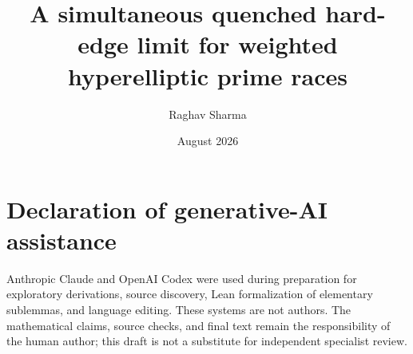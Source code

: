 \documentclass[11pt]{article}
\title{A simultaneous quenched hard-edge limit for weighted hyperelliptic
prime races}
\author{Raghav Sharma}
\date{August 2026}
\numberwithin{equation}{section}
\theoremstyle{definition}
\newcommand{\1}{\mathbf 1}
\begin{document}
\maketitle







\appendix



\section*{Declaration of generative-AI assistance}
Anthropic Claude and OpenAI Codex were used during preparation for exploratory
derivations, source discovery, Lean formalization of elementary sublemmas, and
language editing.  These systems are not authors.  The mathematical claims,
source checks, and final text remain the responsibility of the human author;
this draft is not a substitute for independent specialist review.



\end{document}
